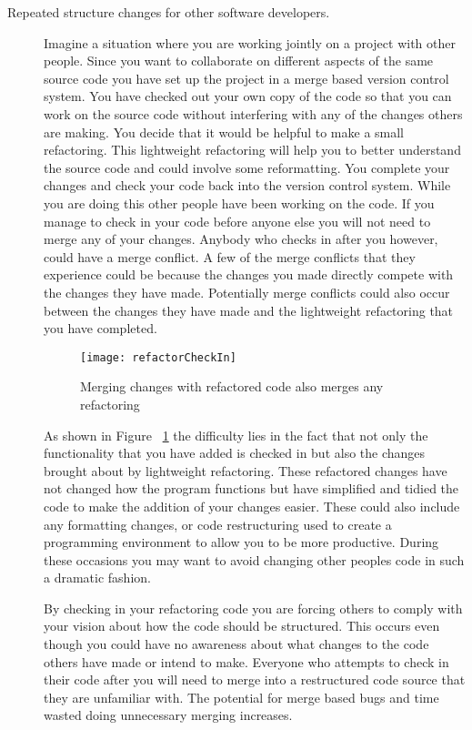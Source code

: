 \begin{description}
\item [Repeated structure changes for other software developers.]
Imagine a situation where you are working jointly on a project with other people. 
Since you want to collaborate on different aspects of the same source code you have set up the project in a merge based version control system.  
You have checked out your own copy of the code so that you can work on the source code without interfering with any of the changes others are making.
You decide that it would be helpful to make a small refactoring.
This lightweight refactoring will help you to better understand the source code and could involve some reformatting. 
You complete your changes and check your code back into the version control system.  
While you are doing this other people have been working on the code.  
If you manage to check in your code before anyone else you will not need to merge any of your changes.  
Anybody who checks in after you however, could have a merge conflict.  
A few of the merge conflicts that they experience could be because the changes you made directly compete with the changes they have made. 
Potentially merge conflicts could also occur between the changes they have made and the lightweight refactoring that you have completed. 
 

\begin{figure}[!t]
\begin{center}
\texttt{[image: refactorCheckIn]}
\end{center}
\caption{Merging changes with refactored code also merges any refactoring}
\label{fig:motMerge}
\end{figure}

As shown in Figure ~\ref{fig:motMerge} the difficulty lies in the fact that not only the functionality that you have added is checked in but also the changes brought about by lightweight refactoring.  These refactored changes have not changed how the program functions but have simplified and tidied the code to make the addition of your changes easier. These could also include any formatting changes, or code restructuring used to create a programming environment to allow you to be more productive.  During these occasions you may want to avoid changing other peoples code in such a dramatic fashion.

By checking in your refactoring code you are forcing others to comply with your vision about how the code should be structured.  This occurs even though you could have no awareness about what changes to the code others have made or intend to make.  Everyone who attempts to check in their code after you will need to merge into a restructured code source that they are unfamiliar with.  The potential for merge based bugs and time wasted doing unnecessary merging increases.


\end{description}
